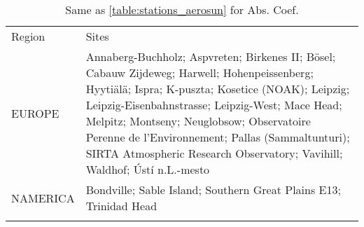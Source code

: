 \documentclass[journal abbreviation, manuscript]{copernicus}
\begin{document}
\begin{table}
 \scriptsize
 \begin{tabularx}{\textwidth}{lX}
  \tophline
  Region   & Sites                                                                                                                                                                                                                                                                                                                                                                            \\
  \middlehline
  EUROPE   & Annaberg-Buchholz; Aspvreten; Birkenes II; Bösel; Cabauw Zijdeweg; Harwell; Hohenpeissenberg; Hyytiälä; Ispra; K-puszta; Kosetice (NOAK); Leipzig; Leipzig-Eisenbahnstrasse; Leipzig-West; Mace Head; Melpitz; Montseny; Neuglobsow; Observatoire Perenne de l'Environnement; Pallas (Sammaltunturi); SIRTA Atmospheric Research Observatory; Vavihill; Waldhof; Ústí n.L.-mesto \\
  NAMERICA & Bondville; Sable Island; Southern Great Plains E13; Trinidad Head                                                                                                                                                                                                                                                                                                                \\
  \bottomhline
 \end{tabularx}
 \caption{Same as \ref{table:stations_aerosun} for Abs. Coef.}
 \label{table:stations_abs}
\end{table}
\end{document}
